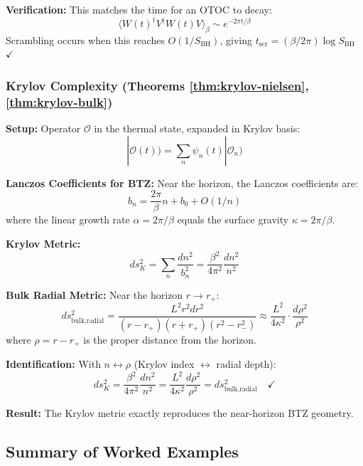 \documentclass[12pt,a4paper]{article}
\begin{document}
\textbf{Verification:}
This matches the time for an OTOC to decay:
\begin{equation}
\langle W(t)^\dagger V^\dagger W(t) V \rangle_\beta \sim e^{-2\pi t/\beta}
\end{equation}
Scrambling occurs when this reaches $O(1/S_{\text{BH}})$, giving $t_{\text{scr}} = (\beta/2\pi)\log S_{\text{BH}}$ $\checkmark$

\subsubsection{Krylov Complexity (Theorems \ref{thm:krylov-nielsen}, \ref{thm:krylov-bulk})}

\textbf{Setup:} Operator $\mathcal{O}$ in the thermal state, expanded in Krylov basis:
\begin{equation}
|\mathcal{O}(t)) = \sum_n \psi_n(t) |\mathcal{O}_n)
\end{equation}

\textbf{Lanczos Coefficients for BTZ:}
Near the horizon, the Lanczos coefficients are:
\begin{equation}
b_n = \frac{2\pi}{\beta} n + b_0 + O(1/n)
\end{equation}
where the linear growth rate $\alpha = 2\pi/\beta$ equals the surface gravity $\kappa = 2\pi/\beta$.

\textbf{Krylov Metric:}
\begin{equation}
ds^2_K = \sum_n \frac{dn^2}{b_n^2} = \frac{\beta^2}{4\pi^2} \frac{dn^2}{n^2}
\end{equation}

\textbf{Bulk Radial Metric:}
Near the horizon $r \to r_+$:
\begin{equation}
ds^2_{\text{bulk,radial}} = \frac{L^2 r^2 dr^2}{(r-r_+)(r+r_+)(r^2-r_-^2)} \approx \frac{L^2}{4\kappa^2} \cdot \frac{d\rho^2}{\rho^2}
\end{equation}
where $\rho = r - r_+$ is the proper distance from the horizon.

\textbf{Identification:}
With $n \leftrightarrow \rho$ (Krylov index $\leftrightarrow$ radial depth):
\begin{equation}
ds^2_K = \frac{\beta^2}{4\pi^2} \frac{dn^2}{n^2} = \frac{L^2}{4\kappa^2} \frac{d\rho^2}{\rho^2} = ds^2_{\text{bulk,radial}} \quad \checkmark
\end{equation}

\textbf{Result:} The Krylov metric exactly reproduces the near-horizon BTZ geometry.

\subsection{Summary of Worked Examples}
\end{document}
